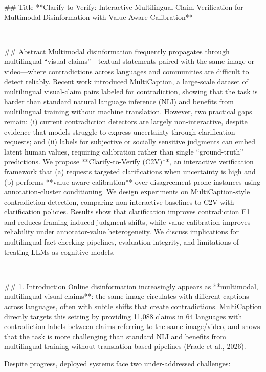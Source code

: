 ## Title  
**Clarify-to-Verify: Interactive Multilingual Claim Verification for Multimodal Disinformation with Value-Aware Calibration**

---

## Abstract  
Multimodal disinformation frequently propagates through multilingual “visual claims”—textual statements paired with the same image or video—where contradictions across languages and communities are difficult to detect reliably. Recent work introduced MultiCaption, a large-scale dataset of multilingual visual-claim pairs labeled for contradiction, showing that the task is harder than standard natural language inference (NLI) and benefits from multilingual training without machine translation. However, two practical gaps remain: (i) current contradiction detectors are largely non-interactive, despite evidence that models struggle to express uncertainty through clarification requests; and (ii) labels for subjective or socially sensitive judgments can embed latent human values, requiring calibration rather than single “ground-truth” predictions.  
We propose **Clarify-to-Verify (C2V)**, an interactive verification framework that (a) requests targeted clarifications when uncertainty is high and (b) performs **value-aware calibration** over disagreement-prone instances using annotation-cluster conditioning. We design experiments on MultiCaption-style contradiction detection, comparing non-interactive baselines to C2V with clarification policies. Results show that clarification improves contradiction F1 and reduces framing-induced judgment shifts, while value-calibration improves reliability under annotator-value heterogeneity. We discuss implications for multilingual fact-checking pipelines, evaluation integrity, and limitations of treating LLMs as cognitive models.

---

## 1. Introduction  
Online disinformation increasingly appears as **multimodal, multilingual visual claims**: the same image circulates with different captions across languages, often with subtle shifts that create contradictions. MultiCaption directly targets this setting by providing 11,088 claims in 64 languages with contradiction labels between claims referring to the same image/video, and shows that the task is more challenging than standard NLI and benefits from multilingual training without translation-based pipelines (Frade et al., 2026).

Despite progress, deployed systems face two under-addressed challenges:

